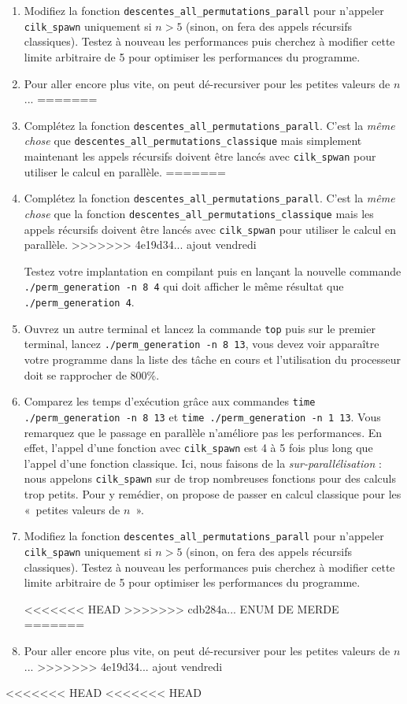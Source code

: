 \documentclass{cours}
\newcommand{\lsti}[1]{\lstinline{#1}{}}
\begin{document}
\begin{exercice}
\begin{enumerate}
\item Modifiez la fonction \lsti{descentes_all_permutations_parall} pour n'appeler \lsti{cilk_spawn} uniquement si $n > 5$ (sinon, on fera des appels récursifs classiques). Testez à nouveau les performances puis cherchez à modifier cette limite arbitraire de 5 pour optimiser les performances du programme.

\item Pour aller encore plus vite, on peut dé-recursiver pour les petites
  valeurs de $n$... 
=======
\item Complétez la fonction \lsti{descentes_all_permutations_parall}. C'est la \textit{même chose} que \lsti{descentes_all_permutations_classique} mais simplement maintenant les appels récursifs doivent être lancés avec \lsti{cilk_spwan} pour utiliser le calcul en parallèle. 
=======
\item Complétez la fonction \lsti{descentes_all_permutations_parall}. C'est la
  \textit{même chose} que la fonction \lsti{descentes_all_permutations_classique} mais les appels récursifs doivent être lancés avec \lsti{cilk_spwan} pour utiliser le calcul en parallèle. 
>>>>>>> 4e19d34... ajout vendredi

Testez votre implantation en compilant puis en lançant la nouvelle commande \lsti{./perm_generation -n 8 4} qui doit afficher le même résultat que \lsti{./perm_generation 4}.

\item Ouvrez un autre terminal et lancez la commande \lsti{top} puis sur le premier terminal, lancez \lsti{./perm_generation -n 8 13}, vous devez voir apparaître votre programme dans la liste des tâche en cours et l'utilisation du processeur doit se rapprocher de 800\%.

\item Comparez les temps d'exécution grâce aux commandes \lsti{time ./perm_generation -n 8 13} et \lsti{time ./perm_generation -n 1 13}. Vous remarquez que le passage en parallèle n'améliore pas les performances. En effet, l'appel d'une fonction avec \lsti{cilk_spawn} est 4  à 5 fois plus long que l'appel d'une fonction classique. Ici, nous faisons de la \textit{sur-parallélisation} : nous appelons \lsti{cilk_spawn} sur de trop nombreuses fonctions pour des calculs trop petits. Pour y remédier, on propose de passer en calcul classique pour les «~petites valeurs de $n$~». 

\item Modifiez la fonction \lsti{descentes_all_permutations_parall} pour n'appeler \lsti{cilk_spawn} uniquement si $n > 5$ (sinon, on fera des appels récursifs classiques). Testez à nouveau les performances puis cherchez à modifier cette limite arbitraire de 5 pour optimiser les performances du programme.

<<<<<<< HEAD
>>>>>>> cdb284a... ENUM DE MERDE
=======
\item Pour aller encore plus vite, on peut dé-recursiver pour les petites
  valeurs de $n$... 
>>>>>>> 4e19d34... ajout vendredi
\end{enumerate}

\end{exercice}

<<<<<<< HEAD
<<<<<<< HEAD
\end{document}
